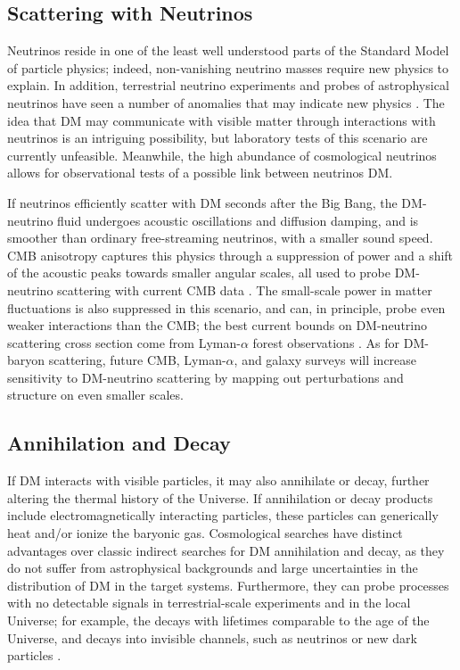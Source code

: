 \documentclass[12pt]{article}
\begin{document}
\vspace{-0.3cm}
\subsection{Scattering with Neutrinos}

Neutrinos reside in one of the least well understood parts of the Standard Model of particle physics; indeed, non-vanishing neutrino masses require new physics to explain. 
In addition, terrestrial neutrino experiments and probes of astrophysical neutrinos have seen a number of anomalies that may indicate new physics \cite{Athanassopoulos:1996jb, Aguilar:2001ty,AguilarArevalo:2007it,2018arXiv180512028M,Gorham:2016zah,Gorham:2018ydl}.
The idea that DM may communicate with visible matter through interactions with neutrinos is an intriguing possibility, but laboratory tests of this scenario are currently unfeasible.
Meanwhile, the high abundance of cosmological neutrinos allows for observational tests of a possible link between neutrinos DM.

If neutrinos efficiently scatter with DM seconds after the Big Bang, the DM-neutrino fluid undergoes acoustic oscillations and diffusion damping, and is smoother than ordinary free-streaming neutrinos, with a smaller sound speed.
CMB anisotropy captures this physics through a suppression of power and a shift of the acoustic peaks towards smaller angular scales, all used to probe DM-neutrino scattering with current CMB data \cite{Mangano:2006mp,Escudero:2015yka,DiValentino:2017oaw,Diacoumis:2018ezi}.
The small-scale power in matter fluctuations is also suppressed in this scenario, and can, in principle, probe even weaker interactions than the CMB; the best current bounds on DM-neutrino scattering cross section come from Lyman-$\alpha$ forest observations \cite{Wilkinson:2014ksa}.
As for DM-baryon scattering, future CMB, Lyman-$\alpha$, and galaxy surveys will increase sensitivity to DM-neutrino scattering by mapping out perturbations and structure on even smaller scales.

\vspace{-0.3cm}
\subsection{Annihilation and Decay}

If DM interacts with visible particles, it may also annihilate or decay, further altering the thermal history of the Universe. 
If annihilation or decay products include electromagnetically interacting particles, these particles can generically heat and/or ionize the baryonic gas.
Cosmological searches have distinct advantages over classic indirect searches for DM annihilation and decay, as they do not suffer from astrophysical backgrounds and large uncertainties in the distribution of DM in the target systems.
Furthermore, they can probe processes with no detectable signals in terrestrial-scale experiments and in the local Universe; for example, the decays with lifetimes comparable to the age of the Universe, and decays into invisible channels, such as neutrinos or new dark particles \cite{Poulin:2016nat,Poulin:2016anj}. 
\end{document}
